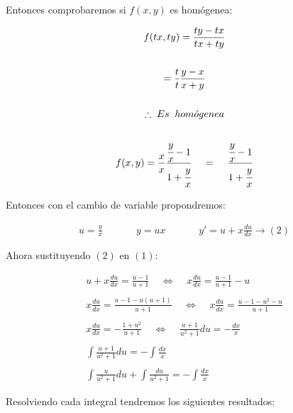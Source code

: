 Entonces comprobaremos si \(\displaystyle f(x,y)\) es homógenea:

\begin{equation*}
    \begin{gathered}
        f(tx,ty)=\frac{ty-tx}{tx+ty}\\\\
        =\frac{t}{t}\frac{y-x}{x+y}\\\\
        \therefore\;Es\;\;hom\acute{o}genea\\\\
        f(x,y)=\frac{x}{x}\frac{\cfrac{y}{x}-1}{1+\cfrac{y}{x}}\;\;\;\;=\;\;\;\;\frac{\cfrac{y}{x}-1}{1+\cfrac{y}{x}}
    \end{gathered}
\end{equation*}

Entonces con el cambio de variable propondremos:

\begin{equation*}
    \begin{gathered}
        u=\frac{y}{x}\;\;\;\;\;\;\;\;\;\;\;\;y=ux\;\;\;\;\;\;\;\;\;\;\;\;y'=u+x\frac{du}{dx}\rightarrow(2)
    \end{gathered}
\end{equation*}

Ahora sustituyendo \(\displaystyle (2)\) en \(\displaystyle (1)\):

\begin{equation*}
    \begin{gathered}
        u+x\frac{du}{dx}=\frac{u-1}{u+1}\;\;\;\;\Leftrightarrow \;\;\;\;x\frac{du}{dx}=\frac{u-1}{u+1}-u\\\\
        x\frac{du}{dx}=\frac{u-1-u(u+1)}{u+1}\;\;\;\;\Leftrightarrow \;\;\;\;x\frac{du}{dx}=\frac{u-1-u^{2}-u}{u+1}\\\\
        x\frac{du}{dx}=-\frac{1+u^{2}}{u+1}\;\;\;\;\Leftrightarrow \;\;\;\;\frac{u+1}{u^{2}+1}du=-\frac{dx}{x}\\\\
        \int\frac{u+1}{u^{2}+1}du=-\int\frac{dx}{x}\\\\
        \int\frac{u}{u^{2}+1}du+\int\frac{du}{u^{2}+1}=-\int\frac{dx}{x}
    \end{gathered}
\end{equation*}

Resolviendo cada integral tendremos los siguientes resultados:

